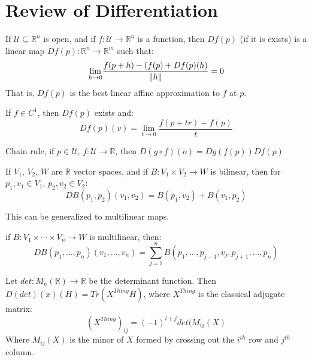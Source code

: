 \documentclass[crop=false,class=book,oneside]{standalone}                      %
\begin{document}
    \section{Review of Differentiation}
        If $\mathcal{U}\subseteq\mathbb{R}^{n}$ is open, and if
        $f:\mathcal{U}\rightarrow\mathbb{R}^{n}$ is a function, then
        $Df(p)$ (if it is exists) is a linear map
        $Df(p):\mathbb{R}^{n}\rightarrow\mathbb{R}^{m}$ such that:
        \begin{equation}
            \underset{h\rightarrow{0}}{\lim}
                \frac{f(p+h)-(f(p)+Df(p)(h)}{\lVert h\rVert}=0
        \end{equation}
        That is, $Df(p)$ is the best linear affine approximation to $f$ at
        $p$.
        \begin{theorem}
            If $f\in{C}^{1}$, then $Df(p)$ exists and:
            \begin{equation}
                Df(p)(v)=\underset{t\rightarrow{0}}{\lim}
                \frac{f(p+tr)-f(p)}{t}
            \end{equation}
        \end{theorem}
        Chain rule, if $p\in\mathcal{U}$,
        $f:\mathcal{U}\rightarrow\mathbb{R}$,
        then $D(g\circ{f})(o)=Dg(f(p))Df(p)$
        \begin{theorem}
            If $V_{1}$, $V_{2}$, $W$ are $\mathbb{R}$ vector spaces, and
            if $B:V_{1}\times{V}_{2}\rightarrow{W}$ is bilinear, then
            for $p_{1},v_{1}\in{V}_{1}$, $p_{2},v_{2}\in{V}_{2}$:
            \begin{equation}
                DB(p_{1},p_{2})(v_{1},v_{2})=B(p_{1},v_{2})+B(v_{1},p_{2})
            \end{equation}
        \end{theorem}
        This can be generalized to multilinear maps.
        \begin{theorem}
            if $B:V_{1}\times\cdots\times{V}_{n}\rightarrow{W}$ is
            multilinear, then:
            \begin{equation}
                DB(p_{1},\dots,p_{n})(v_{1},\dots,v_{n})=
                \sum_{j=1}^{n}B(p_{1},\dots,p_{j-1},v_{j},p_{j+1},\dots,p_{n})
            \end{equation}
        \end{theorem}
        \begin{example}
            Let $det:M_{n}(\mathbb{R})\rightarrow\mathbb{R}$ be the
            determinant function. Then $D(det)(x)(H)=Tr(X^{Thing}H)$,
            where $X^{Thing}$ is the classical adjugate matrix:
            \begin{equation}
                (X^{Thing})_{ij}=(\minus{1})^{i+j}det(M_{ij}(X)
            \end{equation}
            Where $M_{ij}(X)$ is the minor of $X$ formed by crossing out the
            $i^{th}$ row and $j^{th}$ column.
        \end{example}
\end{document}
